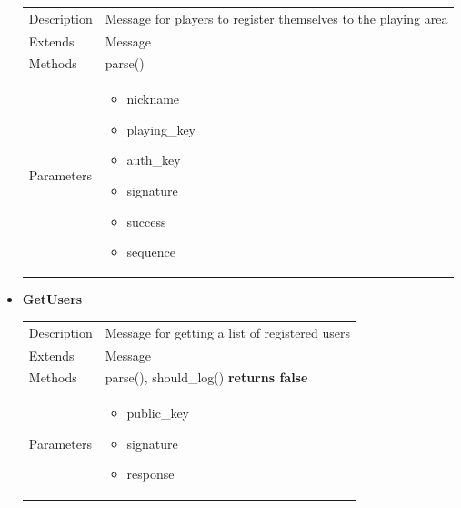 \documentclass[11pt]{article}
\begin{document}
\begin{itemize}
  \begin{longtable}[]{@{}ll@{}}
  \toprule
  \endhead
  \begin{minipage}[t]{0.40\columnwidth}\raggedright
  Description\strut
  \end{minipage} & \begin{minipage}[t]{0.54\columnwidth}\raggedright
  Message for players to register themselves to the playing area\strut
  \end{minipage}\tabularnewline
  \begin{minipage}[t]{0.40\columnwidth}\raggedright
  Extends\strut
  \end{minipage} & \begin{minipage}[t]{0.54\columnwidth}\raggedright
  Message\strut
  \end{minipage}\tabularnewline
  \begin{minipage}[t]{0.40\columnwidth}\raggedright
  Methods\strut
  \end{minipage} & \begin{minipage}[t]{0.54\columnwidth}\raggedright
  parse()\strut
  \end{minipage}\tabularnewline
  \begin{minipage}[t]{0.40\columnwidth}\raggedright
  Parameters\strut
  \end{minipage} & \begin{minipage}[t]{0.54\columnwidth}\raggedright
  \begin{itemize}
  	\item nickname
  	\item   playing\_key
  	\item   auth\_key
	\item signature
	\item success
	\item sequence
  \end{itemize}\strut
  \end{minipage}\tabularnewline
  \bottomrule
  \end{longtable}

\item
  \textbf{GetUsers}

  \begin{longtable}[]{@{}ll@{}}
  \toprule
  \endhead
  Description & Message for getting a list of registered
  users\tabularnewline
  Extends & Message\tabularnewline
  Methods & parse(), should\_log() \textbf{returns false}\tabularnewline
  \begin{minipage}[t]{0.40\columnwidth}\raggedright
  Parameters\strut
  \end{minipage} & \begin{minipage}[t]{0.54\columnwidth}\raggedright
  \begin{itemize}
  	\item public\_key
	\item signature
	\item response
  \end{itemize}\strut
  \end{minipage}\tabularnewline
  \bottomrule
  \end{longtable}


\end{itemize}
\end{document}

